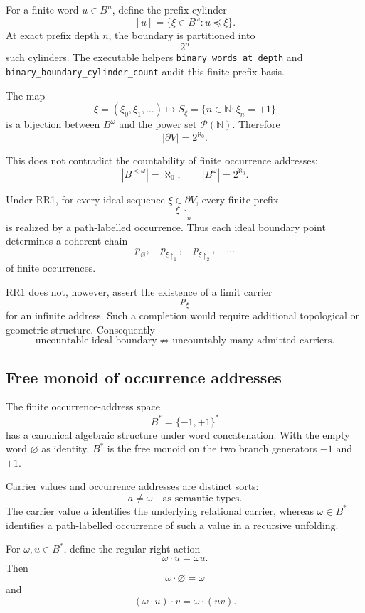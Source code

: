 \documentclass[11pt]{article}
\newcommand{\codeid}[1]{\nolinkurl{#1}}
\begin{document}
For a finite word \(u\in B^n\), define the prefix cylinder
\[
[u]
=
\{
\xi\in B^\omega:
u\preceq\xi
\}.
\]
At exact prefix depth \(n\), the boundary is partitioned into
\[
\boxed{
2^n
}
\]
such cylinders. The executable helpers
\codeid{binary_words_at_depth} and
\codeid{binary_boundary_cylinder_count} audit this finite prefix basis.

The map
\[
\xi=(\xi_0,\xi_1,\ldots)
\longmapsto
S_\xi
=
\{
n\in\mathbb N:
\xi_n=+1
\}
\]
is a bijection between \(B^\omega\) and the power set
\(\mathcal P(\mathbb N)\). Therefore
\[
\boxed{
|\partial V|
=
2^{\aleph_0}.
}
\]

This does not contradict the countability of finite occurrence addresses:
\[
|B^{<\omega}|=\aleph_0,
\qquad
|B^\omega|=2^{\aleph_0}.
\]

Under RR1, for every ideal sequence \(\xi\in\partial V\), every finite
prefix
\[
\xi\!\upharpoonright_n
\]
is realized by a path-labelled occurrence. Thus each ideal boundary point
determines a coherent chain
\[
p_{\varnothing},
\quad
p_{\xi\upharpoonright_1},
\quad
p_{\xi\upharpoonright_2},
\quad\ldots
\]
of finite occurrences.

RR1 does not, however, assert the existence of a limit carrier
\[
p_\xi
\]
for an infinite address. Such a completion would require additional
topological or geometric structure. Consequently
\[
\boxed{
\text{uncountable ideal boundary}
\not\Rightarrow
\text{uncountably many admitted carriers}.
}
\]

\subsection{Free monoid of occurrence addresses}

The finite occurrence-address space
\[
B^*=\{-1,+1\}^{*}
\]
has a canonical algebraic structure under word concatenation. With the empty
word \(\varnothing\) as identity, \(B^*\) is the free monoid on the two
branch generators \(-1\) and \(+1\).

Carrier values and occurrence addresses are distinct sorts:
\[
\boxed{
a\neq\omega
\quad\text{as semantic types.}
}
\]
The carrier value \(a\) identifies the underlying relational carrier,
whereas \(\omega\in B^*\) identifies a path-labelled occurrence of such a
value in a recursive unfolding.

For \(\omega,u\in B^*\), define the regular right action
\[
\boxed{
\omega\cdot u
=
\omega u.
}
\]
Then
\[
\omega\cdot\varnothing=\omega
\]
and
\[
\boxed{
(\omega\cdot u)\cdot v
=
\omega\cdot(uv).
}
\]
\end{document}
